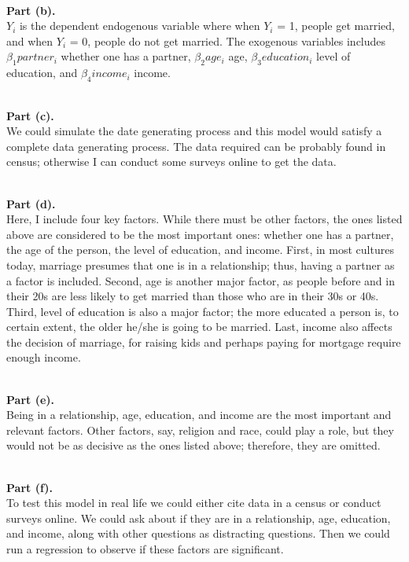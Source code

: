 \documentclass[letterpaper,12pt]{article}
\theoremstyle{definition}
\begin{document}
\noindent\\\textbf{Part (b).}
\\\textbf{$Y_{i}$} is the dependent endogenous variable where when $Y_{i}$ = 1, people get married, and when $Y_{i}$ = 0, people do not get married. The exogenous variables includes $\beta_{1}partner_{i}$ whether one has a partner, $\beta_{2}age_{i}$ age, $\beta_{3}education_{i}$ level of education, and $\beta_{4}income_{i}$ income.

\noindent\\\textbf{Part (c).}
\\We could simulate the date generating process and this model would satisfy a complete data generating process. The data required can be probably found in census; otherwise I can conduct some surveys online to get the data. 

\noindent\\\textbf{Part (d).}
\\Here, I include four key factors. While there must be other factors, the ones listed above are considered to be the most important ones: whether one has a partner, the age of the person, the level of education, and income. First, in most cultures today, marriage presumes that one is in a relationship; thus, having a partner as a factor is included. Second, age is another major factor, as people before and in their 20s are less likely to get married than those who are in their 30s or 40s. Third, level of education is also a major factor; the more educated a person is, to certain extent, the older he/she is going to be married. Last, income also affects the decision of marriage, for raising kids and perhaps paying for mortgage require enough income.  

\noindent\\\textbf{Part (e).} 
\\Being in a relationship, age, education, and income are the most important and relevant factors. Other factors, say, religion and race, could play a role, but they would not be as decisive as the ones listed above; therefore, they are omitted. 

\noindent\\\textbf{Part (f).}
\\To test this model in real life we could either cite data in a census or conduct surveys online. We could ask about if they are in a relationship, age, education, and income, along with other questions as distracting questions. Then we could run a regression to observe if these factors are significant.  
\end{document}

